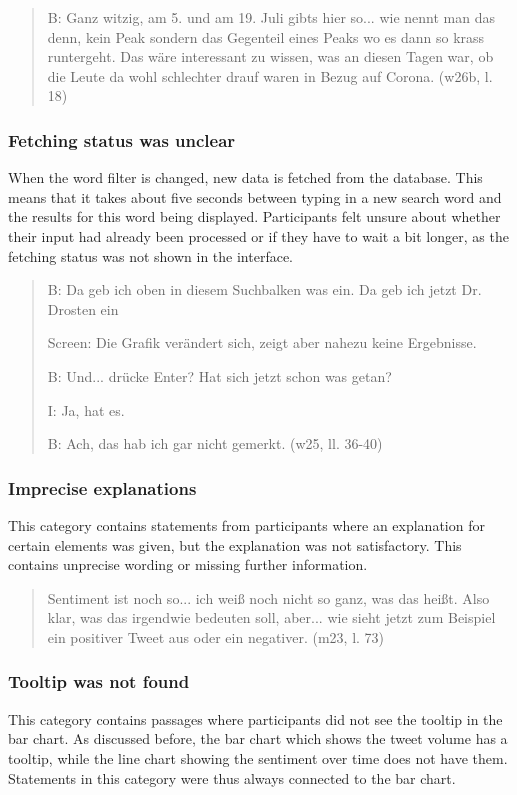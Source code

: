 \begin{quote}
    B: Ganz witzig, am 5. und am 19. Juli gibts hier so... wie nennt man das denn, kein Peak sondern das Gegenteil  eines Peaks wo es dann so krass runtergeht. Das wäre interessant zu wissen, was an diesen Tagen war, ob die Leute da wohl schlechter drauf waren in Bezug auf Corona.  (w26b, l. 18)
\end{quote}

\subsubsection*{Fetching status was unclear}
When the word filter is changed, new data is fetched from the database. This means that it takes about five seconds between typing in a new search word and the results for this word being displayed. Participants felt unsure about whether their input had already been processed or if they have to wait a bit longer, as the fetching status was not shown in the interface.

\begin{quote}
    B: Da geb ich oben in diesem Suchbalken was ein. Da geb ich jetzt Dr. Drosten ein

    Screen: Die Grafik verändert sich, zeigt aber nahezu keine Ergebnisse. 

    B: Und... drücke Enter? Hat sich jetzt schon was getan?

    I: Ja, hat es.

    B: Ach, das hab ich gar nicht gemerkt. (w25, ll. 36-40)
\end{quote}

\subsubsection*{Imprecise explanations}\label{sec:unprecise_explanations}
This category contains statements from participants where an explanation for certain elements was given, but the explanation was not satisfactory. This contains unprecise wording or missing further information.

\begin{quote}
    Sentiment ist noch so... ich weiß noch nicht so ganz, was das heißt. Also klar, was das irgendwie bedeuten soll, aber... wie sieht jetzt zum Beispiel ein positiver Tweet aus oder ein negativer. (m23, l. 73)
\end{quote}

\subsubsection*{Tooltip was not found}
This category contains passages where participants did not see the tooltip in the bar chart. As discussed before, the bar chart which shows the tweet volume has a tooltip, while the line chart showing the sentiment over time does not have them. Statements in this category were thus always connected to the bar chart.

